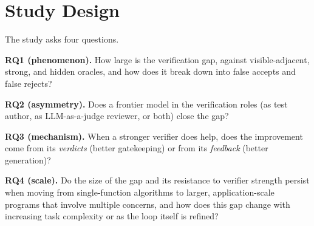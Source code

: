 




\section{Study Design}
\label{sec:design}

The study asks four questions.

\noindent\textbf{RQ1 (phenomenon).} How large is the verification gap, against visible-adjacent,
strong, and hidden oracles, and how does it break down into false accepts and false rejects?

\noindent\textbf{RQ2 (asymmetry).} Does a frontier model in the verification roles (as test author,
as LLM-as-a-judge reviewer, or both) close the gap?

\noindent\textbf{RQ3 (mechanism).} When a stronger verifier does help, does the improvement come
from its \emph{verdicts} (better gatekeeping) or from its \emph{feedback} (better generation)?

\noindent\textbf{RQ4 (scale).} Do the size of the gap and its resistance to verifier strength persist
when moving from single-function algorithms to larger, application-scale programs that involve
multiple concerns, and how does this gap change with increasing task complexity or as the loop
itself is refined?

